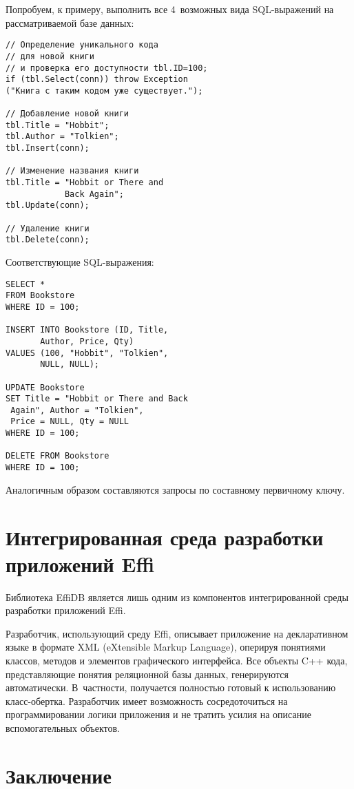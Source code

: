 \begin{multicols}{2}
Попробуем, к примеру, выполнить все 4~возможных вида SQL-выражений на 
рассматриваемой базе данных: 
\begin{verbatim}
// Определение уникального кода
// для новой книги
// и проверка его доступности tbl.ID=100;
if (tbl.Select(conn)) throw Exception 
("Книга с таким кодом уже существует.");

// Добавление новой книги
tbl.Title = "Hobbit";
tbl.Author = "Tolkien";
tbl.Insert(conn);

// Изменение названия книги
tbl.Title = "Hobbit or There and
            Back Again";
tbl.Update(conn);

// Удаление книги
tbl.Delete(conn);
\end{verbatim}

Соответствующие SQL-выражения: 
\begin{verbatim}
SELECT *
FROM Bookstore
WHERE ID = 100;

INSERT INTO Bookstore (ID, Title, 
       Author, Price, Qty)
VALUES (100, "Hobbit", "Tolkien", 
       NULL, NULL);

UPDATE Bookstore
SET Title = "Hobbit or There and Back 
 Again", Author = "Tolkien", 
 Price = NULL, Qty = NULL
WHERE ID = 100;

DELETE FROM Bookstore
WHERE ID = 100;
\end{verbatim}

Аналогичным образом составляются запросы по составному первичному ключу.

\section{Интегрированная среда разработки приложений Effi}

Библиотека EffiDB является лишь одним из компонентов интегрированной среды 
разработки приложений Effi.

Разработчик, использующий среду Effi, описывает приложение на декларативном языке в 
формате XML (eXtensible Markup Language), 
оперируя понятиями классов, методов и элементов графического 
интерфейса. Все объекты C++ кода, представляющие понятия реляционной базы данных, 
генерируются автоматически. В~част\-ности, получается полностью готовый к 
использованию класс-оберт\-ка. Разработчик имеет возможность сосредоточиться на 
программировании логики приложения и не тратить усилия на описание вспомогательных 
объектов.

\section{Заключение}


\end{multicols}

